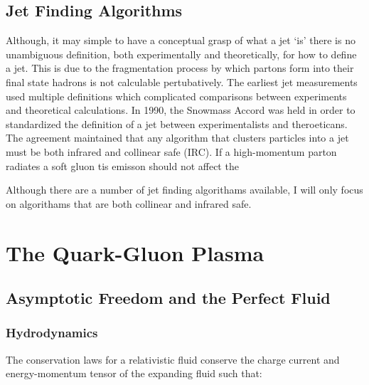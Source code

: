 \subsection{Jet Finding Algorithms}
Although, it may simple to have a conceptual grasp of what a jet `is' there is no unambiguous definition, both experimentally and theoretically, for how to define a jet.  This is due to the fragmentation process by which partons form into their final state hadrons is not calculable pertubatively.  The earliest jet measurements used multiple definitions which complicated comparisons between experiments and theoretical calculations.  In 1990, the Snowmass Accord\cite{Huth:217490} was held in order to standardized the definition of a jet between experimentalists and theroeticans.  The agreement maintained that any algorithm that clusters particles into a jet must be both infrared and collinear safe (IRC).  If a high-momentum parton radiates a soft gluon tis emisson should not affect the 

Although there are a number of jet finding algorithams available, I will only focus on algorithams that are both collinear and infrared safe.   






\section{The Quark-Gluon Plasma}

\subsection{Asymptotic Freedom and the Perfect Fluid}

\subsubsection{Hydrodynamics}
The conservation laws for a relativistic fluid conserve the charge current and energy-momentum tensor of the expanding fluid such that:

